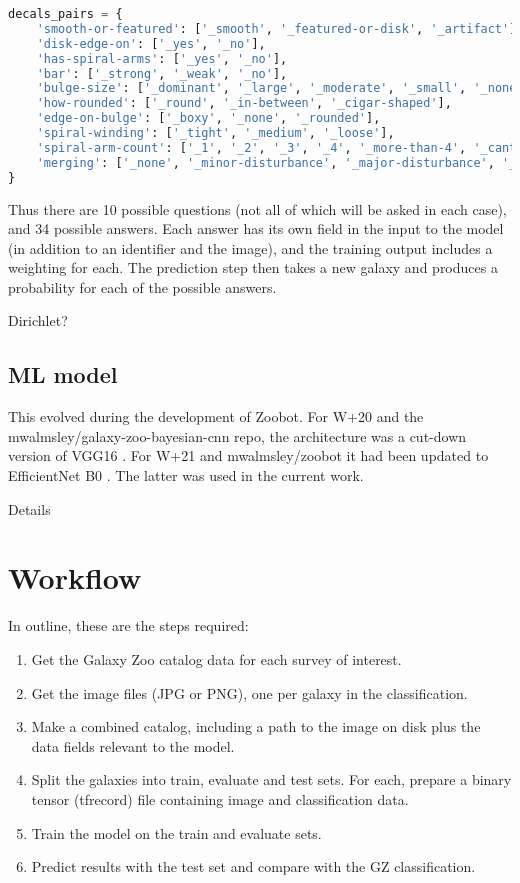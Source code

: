 \documentclass[twocolumn, twocolappendix, tighten]{aastex631}
\newcommand{\todo}{\color{red}{TODO}\color{black}\hspace{2mm}}
\begin{document}
\begin{lstlisting}[language=Python]
decals_pairs = {
	'smooth-or-featured': ['_smooth', '_featured-or-disk', '_artifact'],
	'disk-edge-on': ['_yes', '_no'],
	'has-spiral-arms': ['_yes', '_no'],
	'bar': ['_strong', '_weak', '_no'],
	'bulge-size': ['_dominant', '_large', '_moderate', '_small', '_none'],
	'how-rounded': ['_round', '_in-between', '_cigar-shaped'],
	'edge-on-bulge': ['_boxy', '_none', '_rounded'],
	'spiral-winding': ['_tight', '_medium', '_loose'],
	'spiral-arm-count': ['_1', '_2', '_3', '_4', '_more-than-4', '_cant-tell'],
	'merging': ['_none', '_minor-disturbance', '_major-disturbance', '_merger']
}
\end{lstlisting}

Thus there are 10 possible questions (not all of which will be asked in each case), and 34 possible answers. Each answer has its own field in the input to the model (in addition to an identifier and the image), and the training output includes a weighting for each. The prediction step then takes a new galaxy and produces a probability for each of the possible answers.

\todo Dirichlet?

\subsection{ML model} \label{model}

This evolved during the development of Zoobot. For W+20 and the mwalmsley/galaxy-zoo-bayesian-cnn repo, the architecture was a cut-down version of VGG16 \citep{??}. For W+21 and mwalmsley/zoobot it had been updated to EfficientNet B0 \citep{??}. The latter was used in the current work.

\todo Details

\section{Workflow}

In outline, these are the steps required:

\begin{enumerate}
	\item Get the Galaxy Zoo catalog data for each survey of interest.
	\item Get the image files (JPG or PNG), one per galaxy in the classification.
	\item Make a combined catalog, including a path to the image on disk plus the data fields relevant to the model.
	\item Split the galaxies into train, evaluate and test sets. For each, prepare a binary tensor (tfrecord) file containing image and classification data.
	\item Train the model on the train and evaluate sets.
	\item Predict results with the test set and compare with the GZ classification.
\end{enumerate}
\end{document}
